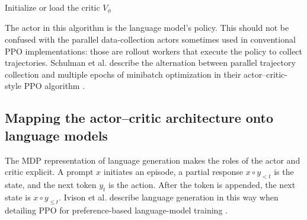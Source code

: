 \begin{algorithm}[H]
    \caption{PPO-style actor--critic optimization for autoregressive language models}
    \label{alg:ac-ppo-llm}
    Initialize or load the critic \(V_\phi\)\;
\end{algorithm}

The actor in this algorithm is the language model's policy. This should not
be confused with the parallel data-collection actors sometimes used in
conventional PPO implementations: those are rollout workers that execute
the policy to collect trajectories. Schulman et al. describe the
alternation between parallel trajectory collection and multiple epochs of
minibatch optimization in their actor--critic-style PPO algorithm
\parencite{schulman2017ppo}.

\subsection{Mapping the actor--critic architecture onto language models}
\label{subsec:ac-llm-mapping}

The MDP representation of language generation makes the roles of the actor
and critic explicit. A prompt \(x\) initiates an episode, a partial response
\(x\circ y_{<t}\) is the state, and the next token \(y_t\) is the action.
After the token is appended, the next state is
\(x\circ y_{\leq t}\). Ivison et al. describe language generation in this
way when detailing PPO for preference-based language-model training
\parencite{ivison2024unpacking}.


